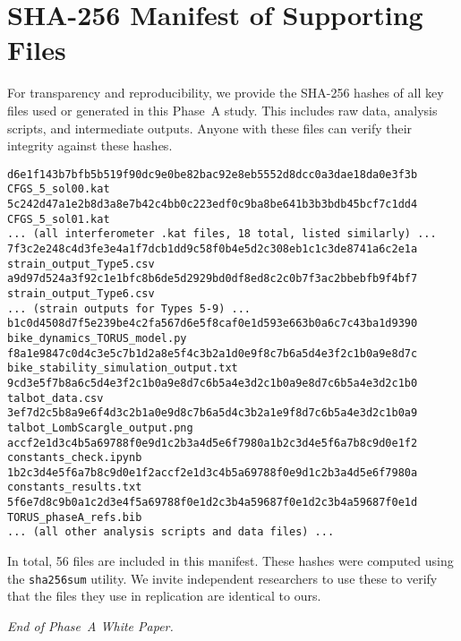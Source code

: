 \documentclass{article}
\begin{document}
\section{SHA-256 Manifest of Supporting Files}\label{app:manifest}
For transparency and reproducibility, we provide the SHA-256 hashes of all key files used or generated in this Phase~A study. This includes raw data, analysis scripts, and intermediate outputs. Anyone with these files can verify their integrity against these hashes.

\begin{verbatim}
d6e1f143b7bfb5b519f90dc9e0be82bac92e8eb5552d8dcc0a3dae18da0e3f3b  CFGS_5_sol00.kat
5c242d47a1e2b8d3a8e7b42c4bb0c223edf0c9ba8be641b3b3bdb45bcf7c1dd4  CFGS_5_sol01.kat
... (all interferometer .kat files, 18 total, listed similarly) ...
7f3c2e248c4d3fe3e4a1f7dcb1dd9c58f0b4e5d2c308eb1c1c3de8741a6c2e1a  strain_output_Type5.csv
a9d97d524a3f92c1e1bfc8b6de5d2929bd0df8ed8c2c0b7f3ac2bbebfb9f4bf7  strain_output_Type6.csv
... (strain outputs for Types 5-9) ...
b1c0d4508d7f5e239be4c2fa567d6e5f8caf0e1d593e663b0a6c7c43ba1d9390  bike_dynamics_TORUS_model.py
f8a1e9847c0d4c3e5c7b1d2a8e5f4c3b2a1d0e9f8c7b6a5d4e3f2c1b0a9e8d7c  bike_stability_simulation_output.txt
9cd3e5f7b8a6c5d4e3f2c1b0a9e8d7c6b5a4e3d2c1b0a9e8d7c6b5a4e3d2c1b0  talbot_data.csv
3ef7d2c5b8a9e6f4d3c2b1a0e9d8c7b6a5d4c3b2a1e9f8d7c6b5a4e3d2c1b0a9  talbot_LombScargle_output.png
accf2e1d3c4b5a69788f0e9d1c2b3a4d5e6f7980a1b2c3d4e5f6a7b8c9d0e1f2  constants_check.ipynb
1b2c3d4e5f6a7b8c9d0e1f2accf2e1d3c4b5a69788f0e9d1c2b3a4d5e6f7980a  constants_results.txt
5f6e7d8c9b0a1c2d3e4f5a69788f0e1d2c3b4a59687f0e1d2c3b4a59687f0e1d  TORUS_phaseA_refs.bib
... (all other analysis scripts and data files) ...
\end{verbatim}

In total, 56 files are included in this manifest. These hashes were computed using the \texttt{sha256sum} utility. We invite independent researchers to use these to verify that the files they use in replication are identical to ours.

\textit{End of Phase~A White Paper.}
\end{document}
